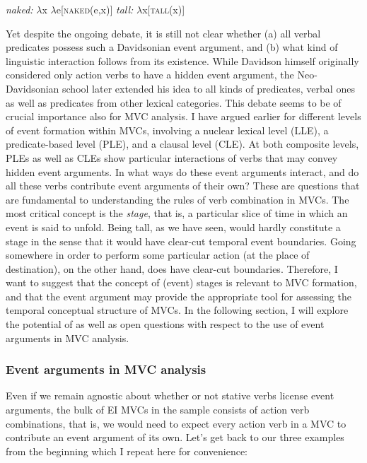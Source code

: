 \ea
\ea \textit{naked:} $\lambda$x $\lambda$e[\textsc{naked}(e,x)]
\ex \textit{tall:} $\lambda$x[\textsc{tall}(x)]
\z
\z

Yet despite the ongoing debate, it is still not clear whether (a) all verbal predicates possess such a Davidsonian event argument, and (b) what kind of linguistic interaction follows from its existence. While Davidson himself originally considered only action verbs to have a hidden event argument, the Neo-Davidsonian school \citep{higginbotham1985semantics, higginbotham2000events, chierchia19953} later extended his idea to all kinds of predicates, verbal ones as well as predicates from other lexical categories. This debate seems to be of crucial importance also for MVC analysis. I have argued earlier for different levels of event formation within MVCs, involving a nuclear lexical level (LLE), a predicate-based level (PLE), and a clausal level (CLE). At both composite levels, PLEs as well as CLEs show particular interactions of verbs that may convey hidden event arguments. In what ways do these event arguments interact, and do all these verbs contribute event arguments of their own? These are questions that are fundamental to understanding the rules of verb combination in MVCs. The most critical concept is the \emph{stage}, that is, a particular slice of time in which an event is said to unfold. Being tall, as we have seen, would hardly constitute a stage in the sense that it would have clear-cut temporal event boundaries. Going somewhere in order to perform some particular action (at the place of destination), on the other hand, does have clear-cut boundaries. Therefore, I want to suggest that the concept of (event) stages is relevant to MVC formation, and that the event argument may provide the appropriate tool for assessing the temporal conceptual structure of MVCs. In the following section, I will explore the potential of as well as open questions with respect to the use of event arguments in MVC analysis.

\subsubsection{Event arguments in MVC analysis}

Even if we remain agnostic about whether or not stative verbs license event arguments, the bulk of EI MVCs in the sample consists of action verb combinations, that is, we would need to expect every action verb in a MVC to contribute an event argument of its own. Let's get back to our three  examples from the beginning which I repeat here for convenience:

